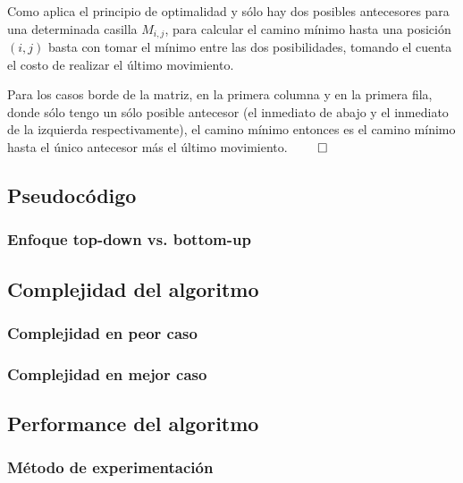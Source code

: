 Como aplica el principio de optimalidad y sólo hay dos posibles antecesores para una determinada casilla $M_{i,j}$, para calcular el camino mínimo hasta una posición $(i,j)$ basta con tomar el mínimo entre las dos posibilidades, tomando el cuenta el costo de realizar el último movimiento.

Para los casos borde de la matriz, en la primera columna y en la primera fila, donde sólo tengo un sólo posible antecesor (el inmediato de abajo y el inmediato de la izquierda respectivamente), el camino mínimo entonces es el camino mínimo hasta el único antecesor más el último movimiento. $\qed$

\subsection{Pseudocódigo}


\subsubsection{Enfoque top-down vs. bottom-up}


\subsection{Complejidad del algoritmo}

\subsubsection{Complejidad en peor caso}

\subsubsection{Complejidad en mejor caso}

\subsection{Performance del algoritmo}

\subsubsection{M\'etodo de experimentación}